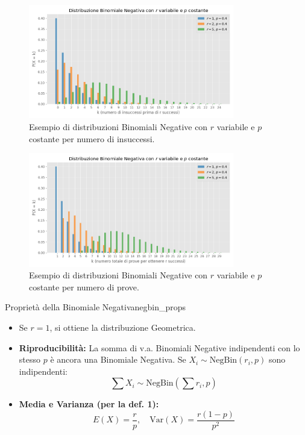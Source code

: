 \begin{figure}[H]
    \centering
    \includegraphics[width=0.8\textwidth]{images/negbin.png}
    \caption{Esempio di distribuzioni Binomiali Negative con \(r\) variabile e \(p\) costante per numero di insuccessi.}
    \label{fig:negbin}
\end{figure}


\begin{figure}[H]
    \centering
    \includegraphics[width=0.8\textwidth]{images/negbin_trials.png}
    \caption{Esempio di distribuzioni Binomiali Negative con \(r\) variabile e \(p\) costante per numero di prove.}
    \label{fig:negbin_trials}
\end{figure}

\begin{proposizione}{Proprietà della Binomiale Negativa}{negbin_props}
\begin{itemize}
    \item Se \(r=1\), si ottiene la distribuzione Geometrica.
    \item \textbf{Riproducibilità:} La somma di v.a. Binomiali Negative indipendenti con lo stesso \(p\) è ancora una Binomiale Negativa. Se \(X_i \sim \text{NegBin}(r_i, p)\) sono indipendenti:
    \[ \sum X_i \sim \text{NegBin}\left(\sum r_i, p\right) \]
    \item \textbf{Media e Varianza (per la def. 1):}
    \[ E(X) = \frac{r}{p}, \quad \text{Var}(X) = \frac{r(1-p)}{p^2} \]
\end{itemize}
\end{proposizione}
